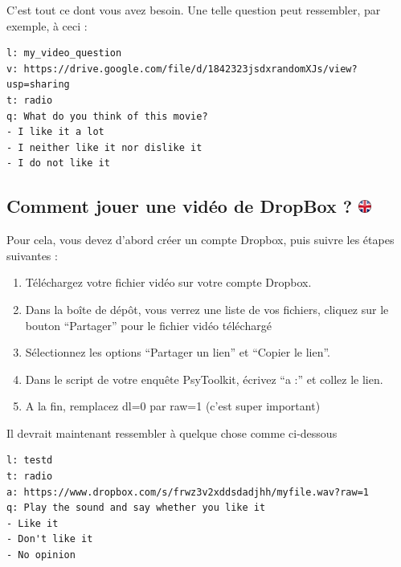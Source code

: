 \documentclass[
]{book}
\providecommand{\tightlist}{%
  \setlength{\itemsep}{0pt}\setlength{\parskip}{0pt}}
\begin{document}
C'est tout ce dont vous avez besoin. Une telle question peut ressembler,
par exemple, à ceci :

\begin{verbatim}
l: my_video_question
v: https://drive.google.com/file/d/1842323jsdxrandomXJs/view?usp=sharing
t: radio
q: What do you think of this movie?
- I like it a lot
- I neither like it nor dislike it
- I do not like it
\end{verbatim}

\hypertarget{comment-jouer-une-viduxe9o-de-dropbox}{%
\subsection[Comment jouer une vidéo de DropBox ?
]{\texorpdfstring{Comment jouer une vidéo de DropBox ?
\href{https://www.psytoolkit.org/lessons/surveyaudiovideo.html\#_how_to_play_a_sound_from_dropbox}{\protect\includegraphics{img/ukflag.png}}}{Comment jouer une vidéo de DropBox ? }}\label{comment-jouer-une-viduxe9o-de-dropbox}}

Pour cela, vous devez d'abord créer un compte Dropbox, puis suivre les
étapes suivantes :

\begin{enumerate}
\def\labelenumi{\arabic{enumi}.}
\tightlist
\item
  Téléchargez votre fichier vidéo sur votre compte Dropbox.
\item
  Dans la boîte de dépôt, vous verrez une liste de vos fichiers, cliquez
  sur le bouton ``Partager'' pour le fichier vidéo téléchargé
\item
  Sélectionnez les options ``Partager un lien'' et ``Copier le lien''.
\item
  Dans le script de votre enquête PsyToolkit, écrivez ``a :'' et collez
  le lien.
\item
  A la fin, remplacez dl=0 par raw=1 (c'est super important)
\end{enumerate}

Il devrait maintenant ressembler à quelque chose comme ci-dessous

\begin{verbatim}
l: testd
t: radio
a: https://www.dropbox.com/s/frwz3v2xddsdadjhh/myfile.wav?raw=1
q: Play the sound and say whether you like it
- Like it
- Don't like it
- No opinion
\end{verbatim}
\end{document}
